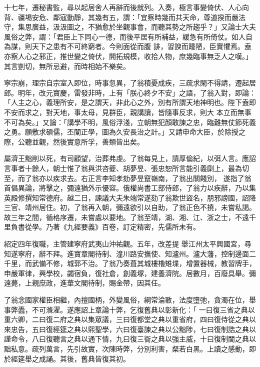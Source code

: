 \begin{pinyinscope}
 十七年，遷秘書監，尋以起居舍人再辭而後就列。入奏，極言事變倚伏、人心向背、疆埸安危、鄰寇動靜，其幾有五，謂：「宜察時幾而共天命，尊道揆而嚴法守，集思廣益，汲汲圖之，不猶愈於坐觀事會，而聽其勢之所趨乎？」又論士大夫風俗之弊，謂：「君臣上下同心一德，而後平居有所補益，緩急有所倚仗。如人自為謀，則天下之患有不可終窮者。今則面從而腹
 誹，習諛而踵陋，臣實懼焉。盍亦察人心之邪正，推世變之倚伏，開拓規模，收拾人物，庶幾臨事無乏人之嘆。」其言剴切，無所忌避，而時相始不樂矣。



 寧宗崩，理宗自宗室入即位，時事忽異，了翁積憂成疾，三疏求閑不得請，遷起居郎。明年，改元寶慶，雷發非時，上有「朕心終夕不安」之語，了翁入對，即論：「人主之心，義理所安，是之謂天，非此心之外，別有所謂天地神明也。陛下盍即不安而求之，對天地，事太母，見群臣，親講讀，皆隨事反求，則大
 本立而無事不可為矣。」又論：「講學不明，風俗浮淺，立朝無犯顏敢諫之忠，臨難無仗節死義之勇。願敷求碩儒，丕闡正學，圖為久安長治之計。」又請申命大臣，於除授之際，公聽並觀，然後實意所孚，善類皆出矣。



 屬濟王黜削以死，有司顧望，治葬弗虔。了翁每見上，請厚倫紀，以弭人言。應詔言事者十餘人，朝士惟了翁與洪咨夔、胡夢昱、張忠恕所言能引義劘上，最為切至，而了翁亦以疾求去。右正言李知孝劾夢昱竄嶺南，了翁出關餞別，
 遂指了翁首倡異論，將擊之，彌遠猶外示優容。俄權尚書工部侍郎，了翁力以疾辭，乃以集英殿修撰知常德府。越二日，諫議大夫朱端常遂劾了翁欺世盜名，朋邪謗國，詔降三官、靖州居住。初，了翁再入朝，彌遠欲引以自助，了翁正色不撓，未嘗私謁。故三年之間，循格序遷，未嘗處以要地。了翁至靖，湖、湘、江、浙之士，不遠千里負書從學。乃著《九經要義》百卷，訂定精密，先儒所未有。



 紹定四年復職，主管建寧府武夷山沖祐觀。五年，改差提
 舉江州太平興國宮，尋知遂寧府，辭不拜。進寶章閣待制、潼川路安撫使、知瀘州。瀘大藩，控制邊面二千里，而武備不修，城郭不治。了翁乃奏葺其城樓櫓雉堞，增置器械，教習牌手，申嚴軍律，興學校，蠲宿負，復社倉，創義塚，建養濟院。居數月，百廢具舉。彌遠薨，上親庶政，進華文閣待制，賜金帶，因其任。



 了翁念國家權臣相繼，內擅國柄，外變風俗，綱常淪斁，法度墮弛，貪濁在位，舉事弊蠹，不可滌濯。遂應詔上章論十弊，乞復舊典以彰新化：「
 一曰復三省之典以重六卿，二曰復二府之典以集眾議，三曰復都堂之典以重省府，四曰復侍從之典以來忠告，五曰復經筵之典以熙聖學，六曰復臺諫之典以公黜陟，七曰復制誥之典以謹命令，八曰復聽言之典以通下情，九曰復三衙之典以強主威，十曰復制閫之典以黜私意。疏列萬言，先引故實，次陳時弊，分別利害，粲若白黑。上讀之感動，即於經筵舉之成誦。其後，舊典皆復其初。




\end{pinyinscope}
